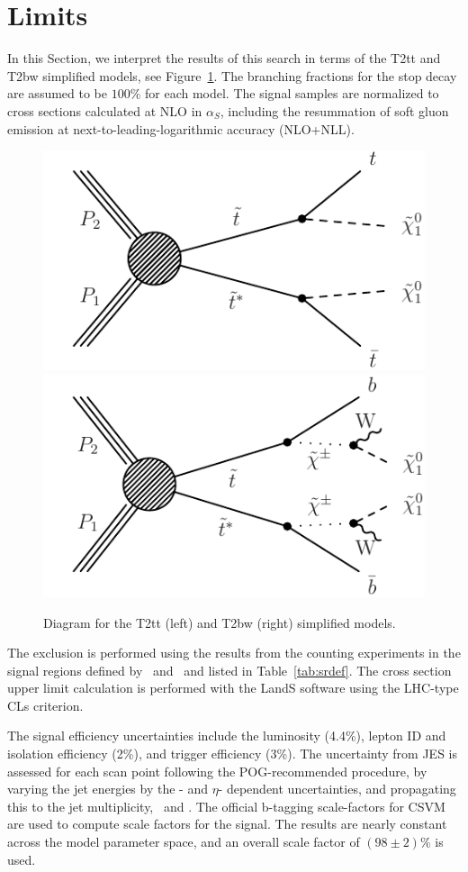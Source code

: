 \section{Limits}
\label{sec:signal}

In this Section, we interpret the results of this search in terms of
the T2tt and T2bw simplified models, see Figure~\ref{fig:SigDiagram}.
The branching fractions for the stop decay are assumed to be $100\%$
for each model. The signal samples are normalized to cross sections
calculated at NLO in $\alpha_S$, including the resummation of soft gluon emission at 
next-to-leading-logarithmic accuracy (NLO+NLL). 

\begin{figure}[hbt]
  \begin{center}
        \includegraphics[width=0.5\linewidth]{plots/stopPlot/T2tt.pdf}%
        \includegraphics[width=0.5\linewidth]{plots/stopPlot/T2bw.pdf}%
	\caption{Diagram for the T2tt (left) and T2bw (right)
          simplified models.}
	\label{fig:SigDiagram}
      \end{center}
\end{figure}

The exclusion is performed using the results from the counting experiments in the signal regions
defined by \met\ and \mt\ and listed in Table~\ref{tab:srdef}. 
The cross section upper limit calculation is performed with the LandS software using the LHC-type CLs criterion. 

The signal efficiency uncertainties include the luminosity (4.4\%), lepton ID and isolation
efficiency (2\%), and trigger efficiency (3\%). The uncertainty from JES
is assessed for each scan point following the POG-recommended
procedure, by varying the jet energies by the \pt- and $\eta$-
dependent uncertainties, and propagating this to the jet multiplicity,
\met\ and \mt. The official b-tagging scale-factors for CSVM are used to compute scale
factors for the signal. The results are nearly constant across the
model parameter space, and an overall scale factor of $(98 \pm 2)\%$
is used. 

